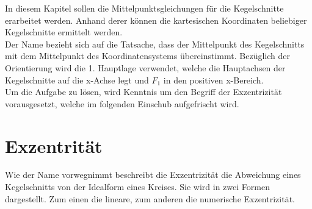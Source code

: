 \setcounter{section}{0}
In diesem Kapitel sollen die Mittelpunktsgleichungen für die Kegelschnitte erarbeitet werden. Anhand derer können die kartesischen Koordinaten beliebiger Kegelschnitte ermittelt werden.\\
Der Name bezieht sich auf die Tatsache, dass der Mittelpunkt des Kegelschnitts mit dem Mittelpunkt des Koordinatensystems übereinstimmt. Bezüglich der Orientierung wird die 1. Hauptlage verwendet, welche die Hauptachsen der Kegelschnitte auf die x-Achse legt und ${F}_1$ in den positiven x-Bereich.\\
Um die Aufgabe zu lösen, wird Kenntnis um den Begriff der Exzentrizität vorausgesetzt, welche im folgenden Einschub aufgefrischt wird.
\section{Exzentrität}
Wie der Name vorwegnimmt beschreibt die Exzentrizität die Abweichung eines Kegelschnitts von der Idealform eines Kreises. Sie wird in zwei Formen dargestellt. Zum einen die lineare, zum anderen die numerische Exzentrizität.
